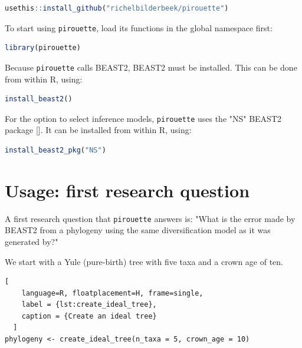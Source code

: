 \documentclass{article}
\begin{document}
\begin{lstlisting}[language=R, floatplacement=H, frame=single]
usethis::install_github("richelbilderbeek/pirouette")
\end{lstlisting}

To start using \verb;pirouette;, load its functions in the global namespace first:

\begin{lstlisting}[language=R, floatplacement=H, frame=single]
library(pirouette)
\end{lstlisting}
Because \verb;pirouette; calls BEAST2, BEAST2 must be installed. 
This can be done from within R, using:

\begin{lstlisting}[language=R, floatplacement=H, frame=single]
install_beast2()
\end{lstlisting}
For the option to select inference models,
\verb;pirouette; uses the "NS" BEAST2 package [\cite{maturana2018model}].
It can be installed from within R, using:

\begin{lstlisting}[language=R, floatplacement=H, frame=single]
install_beast2_pkg("NS")
\end{lstlisting}

\section{Usage: first research question}

A first research question that \verb;pirouette; answers is:
"What is the error made by BEAST2 from a phylogeny using the same diversification model as it was generated by?"

We start with a Yule (pure-birth) tree with five taxa and a crown age of ten.

\begin{lstlisting}[
    language=R, floatplacement=H, frame=single, 
    label = {lst:create_ideal_tree}, 
    caption = {Create an ideal tree}
  ]
phylogeny <- create_ideal_tree(n_taxa = 5, crown_age = 10)
\end{lstlisting}
\end{document}

